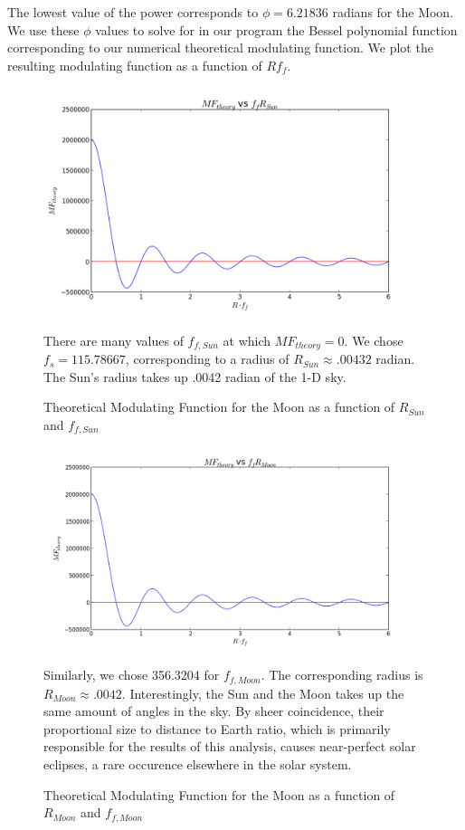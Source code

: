 \documentclass{article}
\begin{document}
The lowest value of the power corresponds to $\phi = 6.21836$ radians
for the Moon. We use these $\phi$ values to solve for in our program the
Bessel polynomial function corresponding to our numerical theoretical
modulating function. We plot the resulting modulating function as a
function of $Rf_{f}$. 
\begin{figure}[H]
\centering
\includegraphics[width=\textwidth]{sun_MF.png}
\caption{Theoretical Modulating Function for the Moon as a function of
  $R_{Sun}$ and $f_{f,Sun}$}
There are many values of $f_{f,Sun}$ at which $MF_{theory} = 0$. We
chose $f_{s} = 115.78667$, corresponding to a radius of $R_{Sun} \approx
.00432$ radian. The Sun's radius takes up .0042 radian of the 1-D sky. 
\end{figure}\begin{figure}[H]
\centering
\includegraphics[width=\textwidth]{moon_MF.png}
\caption{Theoretical Modulating Function for the Moon as a function of
  $R_{Moon}$ and $f_{f,Moon}$}
Similarly, we chose 356.3204 for $f_{f,Moon}$. The corresponding radius
is $R_{Moon} \approx .0042$. Interestingly, the Sun and the Moon takes
up the same amount of angles in the sky. By sheer coincidence, their
proportional size to distance to Earth ratio, which is primarily
responsible for the results of this analysis, causes near-perfect solar
eclipses, a rare occurence elsewhere in the solar system.
\end{figure}
\end{document}
